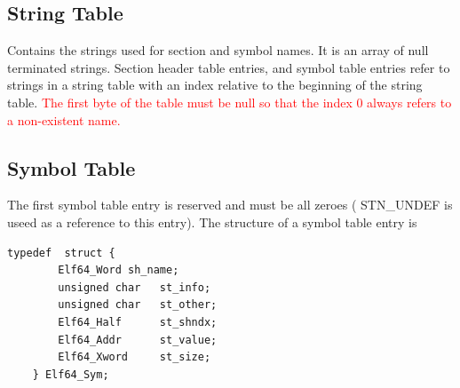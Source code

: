 \documentclass[paper=a4, fontsize=11pt]{report} %
\numberwithin{equation}{section} %
\numberwithin{figure}{section} %
\numberwithin{table}{section} %
\begin{document}
\subsection{String Table}
Contains the strings used for section and symbol names. It is an array of null 
terminated strings. Section header table entries, and symbol table entries 
refer to strings in a string table with an index relative to the beginning of 
the string table. \textcolor{red}{The first byte of the table must be null so 
that the index 0 always refers to a non-existent name.}

\subsection{Symbol Table}
The first symbol table entry is reserved and must be all zeroes ({\ttfamily 
STN\_UNDEF} is useed as a reference to this entry).
The structure of a symbol table entry is

\begin{lstlisting}[style=ansic, caption={Symbol Table Entry}, label=shdr]
	typedef  struct {
		Elf64_Word sh_name;
		unsigned char 	st_info;
		unsigned char 	st_other;
		Elf64_Half 		st_shndx;
		Elf64_Addr 		st_value;
		Elf64_Xword 	st_size;
	} Elf64_Sym;
\end{lstlisting}
\end{document}

